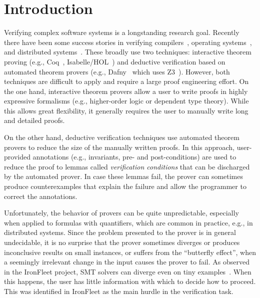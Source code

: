 \section{Introduction}

\begin{sloppypar}
Verifying complex software systems is a longstanding research goal.
Recently there have been some success stories in verifying
compilers~\cite{Compcert}, operating systems~\cite{sel4}, and
distributed systems~\cite{IronFleet,Verdi}.  These broadly use two
techniques: interactive theorem proving (e.g., Coq~\cite{coq},
Isabelle/HOL~\cite{nipkow_isabelle/hol:_2002}) and deductive
verification based on automated theorem provers (e.g.,
Dafny~\cite{Dafny} which uses Z3~\cite{Z3}). However, both techniques
are difficult to apply and require a large proof engineering effort.
On the one hand, interactive theorem provers allow a user to write
proofs in highly expressive formalisms (e.g., higher-order logic or
dependent type theory).  While this allows great flexibility, it
generally requires the user to manually write long and detailed
proofs.
\end{sloppypar}

On the other hand, deductive verification techniques use automated theorem provers
to reduce the size of the manually written proofs. In this approach,
user-provided annotations (e.g., invariants, pre- and post-conditions)
are used to reduce the proof to
lemmas called \emph{verification conditions} that can be discharged by
the automated prover.  In case these lemmas fail, the prover can
sometimes produce counterexamples that explain the failure and allow
the programmer to correct the annotations.

Unfortunately, the behavior of provers can be quite unpredictable,
especially when applied to formulas with quantifiers, which are common
in practice, e.g., in distributed systems. Since the problem presented to
the prover is in general undecidable, it is no surprise that the
prover sometimes diverges or produces inconclusive results on small
instances, or suffers from the ``butterfly effect'', when a seemingly
irrelevant change in the input causes the prover to fail. As observed
in the IronFleet project, SMT solvers can diverge even on tiny
examples~\cite{IronFleet}. When this happens, the user has little information with
which to decide how to proceed.  This was identified in IronFleet as
the main hurdle in the verification task.

